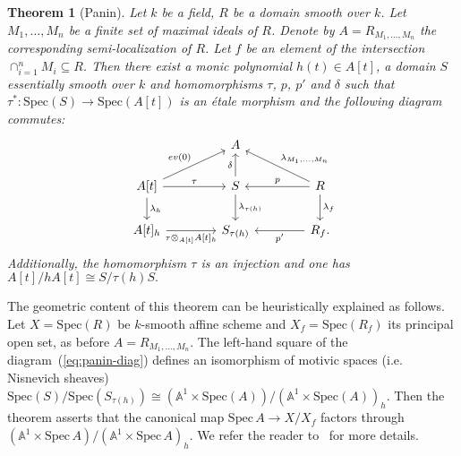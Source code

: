 \documentclass[oneside, 11pt]{amsart}
\numberwithin{equation}{section}
\newtheorem{theorem}[lemma]{Theorem}
\theoremstyle{definition}
\theoremstyle{definition}
\theoremstyle{remark}
\begin{document}
\begin{theorem}[Panin]\label{thm:Panin}
\label{paninthm}
	Let $k$ be a field, $R$ be a domain smooth over $k$. Let $M_1,\ldots, M_n$ be a finite set of maximal ideals of $R$. Denote by $A=R_{M_1,\ldots,M_n}$ the corresponding semi-localization of $R$. Let $f$ be an element of the intersection  $\cap_{i=1}^nM_i \subseteq R$. Then there exist a monic polynomial $h(t)\in A[t]$, a domain $S$ essentially smooth over $k$ and homomorphisms $\tau$, $p$, $p'$ and $\delta$ such that $\tau^*\colon\mathrm{Spec}(S)\to\mathrm{Spec}(A[t])$ is an {\'e}tale morphism and the following diagram commutes:
\begin{equation}\label{eq:panin-diag}
 \begin{tikzcd}[column sep=4em]
   & A & \\ A[t] \ar{d}{\lambda_h} \ar{ru}{ev(0)} \ar{r}{\tau} & S \ar{u}{\delta} \ar{d}{\lambda_{\tau(h)}}  & R \ar{ul}[swap]{\lambda_{M_1,\ldots,M_n}} \ar{d}{\lambda_f} \ar{l}[swap]{p} \\
   A[t]_h \ar{r}[swap]{\tau\otimes_{A[t]}A[t]_h}              & S_{\tau(h)}      & R_f. \ar{l}{p'}\end{tikzcd}
\end{equation}
Additionally, the homomorphism $\tau$ is an injection and one has $A[t]/hA[t]\cong S/\tau(h)S.$ 
\end{theorem}

The geometric content of this theorem can be heuristically explained as follows. Let $X=\mathrm{Spec}(R)$ be $k$-smooth affine scheme and $X_f=\mathrm{Spec}(R_f)$ its principal open set, as before $A= R_{M_1,\ldots, M_n}$. The left-hand square of the diagram~(\ref{eq:panin-diag}) defines an isomorphism of motivic spaces (i.e. Nisnevich sheaves) $\mathrm{Spec}(S)/\mathrm{Spec}(S_{\tau(h)})\cong(\mathbb A^1\times\mathrm{Spec}(A))/(\mathbb A^1\times\mathrm{Spec}(A))_h$. Then the theorem asserts that the canonical map $\mathrm{Spec}\,A\to X/X_f$ factors through $(\mathbb A^1\times\mathrm{Spec}\,A)/(\mathbb A^1\times\mathrm{Spec}\,A)_h$. We refer the reader to~\cite[Section~2]{Pa19} for more details.
\end{document}

